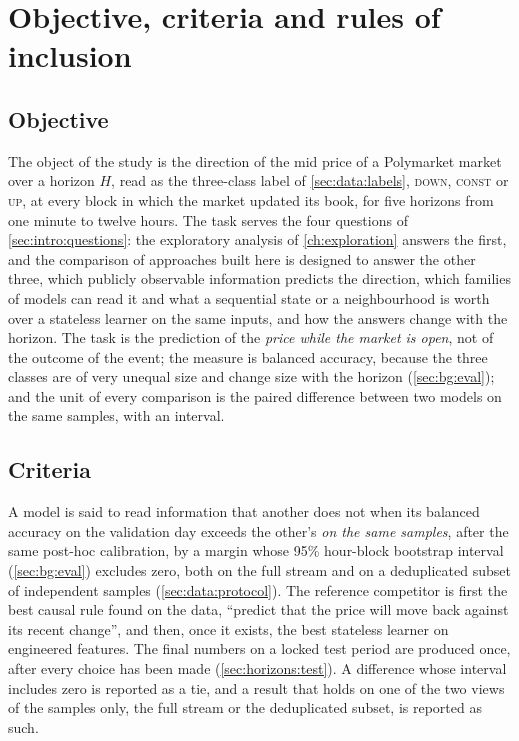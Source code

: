 \section{Objective, criteria and rules of inclusion}
\label{sec:meth:rationale}

\subsection{Objective}
\label{sec:meth:objective}

The object of the study is the direction of the mid price of a Polymarket market over a
horizon $H$, read as the three-class label of \cref{sec:data:labels}, \textsc{down},
\textsc{const} or \textsc{up}, at every block in which the market updated its book, for
five horizons from one minute to twelve hours.  The task serves the four questions of
\cref{sec:intro:questions}: the exploratory analysis of \cref{ch:exploration} answers the
first, and the comparison of approaches built here is designed to answer the other three,
which publicly observable information predicts the direction, which families of models
can read it and what a sequential state or a neighbourhood is worth over a stateless
learner on the same inputs, and how the answers change with the horizon.  The task is the
prediction of the \emph{price while the market is open}, not of the outcome of the event;
the measure is balanced accuracy, because the three classes are of very unequal size and
change size with the horizon (\cref{sec:bg:eval}); and the unit of every comparison is
the paired difference between two models on the same samples, with an interval.

\subsection{Criteria}
\label{sec:meth:criteria}

A model is said to read information that another does not
when its balanced accuracy on the validation day exceeds the other's \emph{on the same
samples}, after the same post-hoc calibration, by a margin whose 95\% hour-block bootstrap
interval (\cref{sec:bg:eval}) excludes zero, both on the full stream and on a deduplicated subset of independent
samples (\cref{sec:data:protocol}).  The reference competitor is first the best causal
rule found on the data, ``predict that the price will move back against its recent
change'', and then, once it exists, the best stateless learner on engineered features.  The
final numbers on a locked test period are produced once, after every choice has been made
(\cref{sec:horizons:test}).  A difference whose interval includes zero is reported as a tie, and a
result that holds on one of the two views of the samples only, the full stream or the
deduplicated subset, is reported as such.

